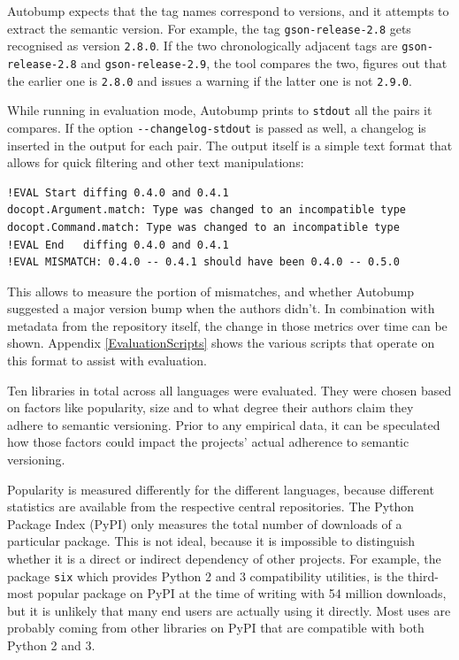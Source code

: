 \documentclass{l4proj}
\newcommand\genericstyle{\lstset{basicstyle=\ttm}}
\newcommand\codeinline[1]{{\genericstyle\lstinline!#1!}}
\begin{document}
Autobump expects that the tag names correspond to versions, and it
attempts to extract the semantic version. For example, the tag
\codeinline{gson-release-2.8} gets recognised as version
\codeinline{2.8.0}. If the two chronologically adjacent tags are
\codeinline{gson-release-2.8} and \codeinline{gson-release-2.9}, the
tool compares the two, figures out that the earlier one is
\codeinline{2.8.0} and issues a warning if the latter one is not
\codeinline{2.9.0}.

While running in evaluation mode, Autobump prints to
\codeinline{stdout} all the pairs it compares. If the option
\codeinline{--changelog-stdout} is passed as well, a changelog is
inserted in the output for each pair. The output itself is a simple
text format that allows for quick filtering and other text
manipulations:

\begin{center}
\begin{BVerbatim}
!EVAL Start diffing 0.4.0 and 0.4.1
docopt.Argument.match: Type was changed to an incompatible type
docopt.Command.match: Type was changed to an incompatible type
!EVAL End   diffing 0.4.0 and 0.4.1
!EVAL MISMATCH: 0.4.0 -- 0.4.1 should have been 0.4.0 -- 0.5.0
\end{BVerbatim}
\end{center}

This allows to measure the portion of mismatches, and whether Autobump
suggested a major version bump when the authors didn't. In combination
with metadata from the repository itself, the change in those metrics
over time can be shown. Appendix \ref{EvaluationScripts} shows the
various scripts that operate on this format to assist with evaluation.

Ten libraries in total across all languages were evaluated. They were
chosen based on factors like popularity, size and to what degree their
authors claim they adhere to semantic versioning. Prior to any
empirical data, it can be speculated how those factors could impact
the projects' actual adherence to semantic versioning.

Popularity is measured differently for the different languages, because
different statistics are available from the respective central
repositories. The Python Package Index (PyPI) \cite{PyPI} only measures
the total number of downloads of a particular package. This is not
ideal, because it is impossible to distinguish whether it is a direct
or indirect dependency of other projects. For example, the package
\codeinline{six} which provides Python 2 and 3 compatibility
utilities, is the third-most popular package on PyPI at the time of
writing with 54 million downloads, but it is unlikely that many end
users are actually using it directly. Most uses are probably coming
from other libraries on PyPI that are compatible with both Python 2
and 3.
\end{document}
